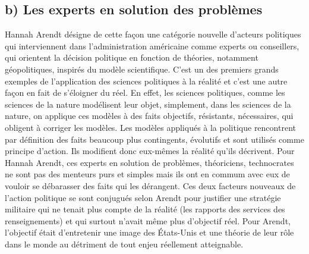 \documentclass[12pt]{article}
\begin{document}
\subsection*{b) Les experts en solution des problèmes}
Hannah Arendt désigne de cette façon une catégorie nouvelle d'acteurs politiques qui interviennent dans l'administration américaine comme experts ou conseillers, qui orientent la décision politique en fonction de théories, notamment géopolitiques, inspirés du modèle scientifique.
C'est un des premiers grands exemples de l'application des sciences politiques à la réalité et c'est une autre façon en fait de s'éloigner du réel.
En effet, les sciences politiques, comme les sciences de la nature modélisent leur objet, simplement, dans les sciences de la nature, on applique ces modèles à des faits objectifs, résistants, nécessaires, qui obligent à corriger les modèles.
Les modèles appliqués à la politique rencontrent par définition des faits beaucoup plus contingents, évolutifs et sont utilisés comme principe d'action.
Ils modifient donc eux-mêmes la réalité qu'ils décrivent.
Pour Hannah Arendt, ces experts en solution de problèmes, théoriciens, technocrates ne sont pas des menteurs purs et simples mais ils ont en commum avec eux de vouloir se débarasser des faits qui les dérangent.
Ces deux facteurs nouveaux de l'action politique se sont conjugués selon Arendt pour justifier une stratégie militaire qui ne tenait plus compte de la réalité (les rapports des services des renseignements) et qui surtout n'avait même plus d'objectif réel.
Pour Arendt, l'objectif était d'entretenir une image des États-Unis et une théorie de leur rôle dans le monde au détriment de tout enjeu réellement atteignable.
\end{document}
